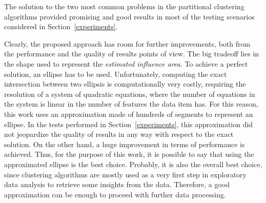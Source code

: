 The solution to the two most common problems in the partitional clustering
algorithms provided promising and good results in most of the testing
scenarios considered in Section~\ref{experiments}.

Clearly, the proposed approach has room for further improvements, both from
the performance and the quality of results points of view. The big tradeoff
lies in the shape used to represent the \emph{estimated influence area}. To
achieve a perfect solution, an ellipse has to be used. Unfortunately, computing
the exact intersection between two ellipsis is computationally very costly,
requiring the resolution of a system of quadratic equations, where the number
of equations in the system is linear in the number of features the data item has.
For this reason, this work uses an approximation made of hundreds of segments
to represent an ellipse. In the tests performed in Section~\ref{experiments},
this approximation did not jeopardize the quality of results in any way with
respect to the exact solution. On the other hand, a huge improvement in terms
of performance is achieved. Thus, for the purpose of this work, it is possible
to say that using the approximated ellipse is the best choice. Probably, it is
also the overall best choice, since clustering algorithms are mostly used as 
a very first step in exploratory data analysis to retrieve some insights from
the data. Therefore, a good approximation can be enough to proceed with
further data processing.   

